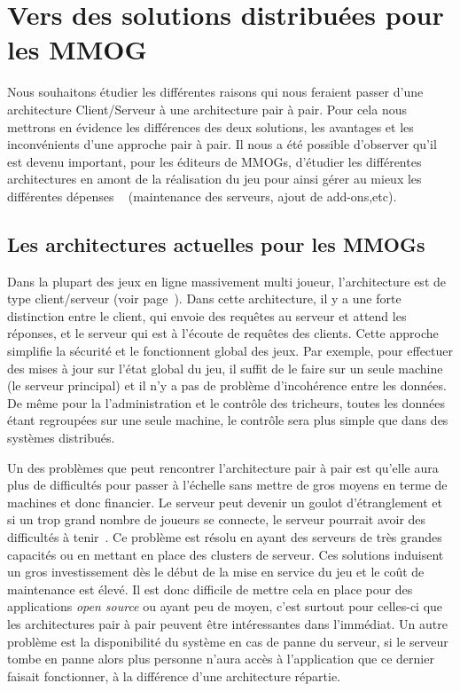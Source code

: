 \section{Vers des solutions distribuées pour les MMOG}
	\label{whyp2p}
	Nous souhaitons étudier les différentes raisons qui nous feraient passer d'une architecture Client/Serveur à une architecture pair à pair. Pour cela nous mettrons en évidence les différences des deux solutions, les avantages et les inconvénients d'une approche pair à pair. Il nous a été possible d'observer qu'il est devenu important, pour les éditeurs de MMOGs, d'étudier les différentes architectures en amont de la réalisation du jeu pour ainsi gérer au mieux les différentes dépenses ~\cite{14101410} (maintenance des serveurs, ajout de add-ons,etc).
	\subsection{Les architectures actuelles pour les MMOGs}
	\par Dans la plupart des jeux en ligne massivement multi joueur, l'architecture est de type client/serveur (voir page~\pageref{P2P/ClServ}). Dans cette architecture, il y a une forte distinction entre le client, qui envoie des requêtes au serveur et attend les réponses, et le serveur qui est à l'écoute de requêtes des clients. Cette approche simplifie la sécurité et le fonctionnent global des jeux. Par exemple, pour effectuer des mises à jour sur l'état global du jeu, il suffit de le faire sur un seule machine (le serveur principal) et il n'y a pas de problème d'incohérence entre les données. De même pour la l'administration et le contrôle des tricheurs, toutes les données étant regroupées sur une seule machine, le contrôle sera plus simple que dans des systèmes distribués. \\
	\par Un des problèmes que peut rencontrer l'architecture pair à pair est qu'elle aura plus de difficultés pour passer à l'échelle sans mettre de gros moyens en terme de machines et donc financier. Le serveur peut devenir un goulot d'étranglement et si un trop grand nombre de joueurs se connecte, le serveur pourrait avoir des difficultés à tenir~\cite{1198269}. Ce problème est résolu en ayant des serveurs de très grandes capacités ou en mettant en place des clusters de serveur. Ces solutions induisent un gros investissement dès le début de la mise en service du jeu et le coût de maintenance est élevé. Il est donc difficile de mettre cela en place pour des applications \textit{open source} ou ayant peu de moyen, c'est surtout pour celles-ci que les architectures pair à pair peuvent être intéressantes dans l'immédiat. Un autre problème est la disponibilité du système en cas de panne du serveur, si le serveur tombe en panne alors plus personne n'aura accès à l'application que ce dernier faisait fonctionner, à la différence d'une architecture répartie. \\
